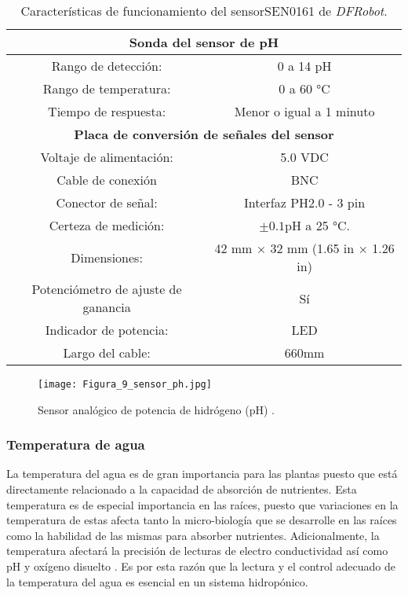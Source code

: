 \begin{table}[H]
	\centering
	\begin{tabular}{|c|c|}
		\hline
		\multicolumn{2}{|c|}{\textbf{Sonda del sensor de pH}}\\ \hline
		Rango de detección: & 0 a 14 pH \\ \hline
		Rango de temperatura: & 0 a 60 °C \\ \hline
		Tiempo de respuesta: & Menor o igual a 1 minuto \\ \hline
		\multicolumn{2}{|c|}{\textbf{Placa de conversión de señales del sensor}}\\ \hline 
		Voltaje de alimentación: & 5.0 VDC \\ \hline
		Cable de conexión & BNC \\ \hline
		Conector de señal: & Interfaz PH2.0 - 3 pin \\ \hline
		Certeza de medición: & $\pm 0.1$pH a 25 °C. \\ \hline
		Dimensiones: & 42 mm $\times$ 32 mm (1.65 in $\times$ 1.26 in) \\ \hline
		Potenciómetro de ajuste de ganancia & Sí \\ \hline
		Indicador de potencia: & LED \\ \hline
		Largo del cable: & 660mm \\ \hline
	\end{tabular}
	\caption{Características de funcionamiento del sensorSEN0161 de \textit{DFRobot}.}
	\label{Cuadro3}
\end{table}

\begin{figure}[H]
	\centering
	\texttt{[image: Figura\_9\_sensor\_ph.jpg]}
	\caption{Sensor analógico de potencia de hidrógeno (pH) \cite{DFRobot_PHsensor}.}
	\label{fig:mesh9}
\end{figure}
	
\subsubsection*{Temperatura de agua}
La temperatura del agua es de gran importancia para las plantas puesto que está directamente relacionado a la capacidad de absorción de nutrientes. Esta temperatura es de especial importancia en las raíces, puesto que variaciones en la temperatura de estas afecta tanto la micro-biología que se desarrolle en las raíces como la habilidad de las mismas para absorber nutrientes. Adicionalmente, la temperatura afectará la precisión de lecturas de electro conductividad así como pH y oxígeno disuelto \cite{voogt_nutrient_2019}. Es por esta razón que la lectura y el control adecuado de la temperatura del agua es esencial en un sistema hidropónico. 


